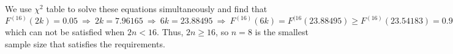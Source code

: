 We use $\chi^2$ table to solve these equations simultaneously and find that
\begin{equation}
F^{(16)}(2k) = 0.05 \ \Rightarrow \ 2k = 7.96165\ \Rightarrow \ 6k = 23.88495 \ \Rightarrow \ F^{(16)}(6k) = F^{(16}(23.88495) \geq F^{(16)}(23.54183) = 0.9
\end{equation}
which can not be satisfied when $2n<16$. Thus, $2n\geq 16$, so $n=8$ is the smallest sample size that satisfies the requirements.

